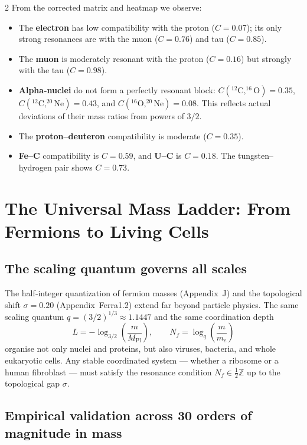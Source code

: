 \documentclass[11pt,a4paper]{article}
\begin{document}
	\begin{multicols}{2}
		From the corrected matrix and heatmap we observe:
		\begin{itemize}
			\item The \textbf{electron} has low compatibility with the proton (\(C=0.07\)); its only strong resonances are with the muon (\(C=0.76\)) and tau (\(C=0.85\)).
			\item The \textbf{muon} is moderately resonant with the proton (\(C=0.16\)) but strongly with the tau (\(C=0.98\)).
			\item \textbf{Alpha-nuclei} do not form a perfectly resonant block: \(C(^{12}\text{C},^{16}\text{O})=0.35\), \(C(^{12}\text{C},^{20}\text{Ne})=0.43\), and \(C(^{16}\text{O},^{20}\text{Ne})=0.08\). This reflects actual deviations of their mass ratios from powers of \(3/2\).
			\item The \textbf{proton--deuteron} compatibility is moderate (\(C=0.35\)).
			\item \textbf{Fe--C} compatibility is \(C=0.59\), and \textbf{U--C} is \(C=0.18\). The tungsten–hydrogen pair shows \(C=0.73\).
		\end{itemize}
	\end{multicols}
	
\section{The Universal Mass Ladder: From Fermions to Living Cells}
\label{sec:ladder_cells}

\subsection{The scaling quantum governs all scales}

The half‑integer quantization of fermion masses (Appendix~J) and the topological shift \(\sigma = 0.20\) (Appendix~Ferra1.2) extend far beyond particle physics. The same scaling quantum \(q = (3/2)^{1/3} \approx 1.1447\) and the same coordination depth
\[
L = -\log_{3/2}\left(\frac{m}{M_{\mathrm{Pl}}}\right), \qquad
N_f = \log_q\left(\frac{m}{m_e}\right)
\]
organise not only nuclei and proteins, but also viruses, bacteria, and whole eukaryotic cells. Any stable coordinated system — whether a ribosome or a human fibroblast — must satisfy the resonance condition \(N_f \in \frac{1}{2}\mathbb{Z}\) up to the topological gap \(\sigma\).

\subsection{Empirical validation across 30 orders of magnitude in mass}
\end{document}
